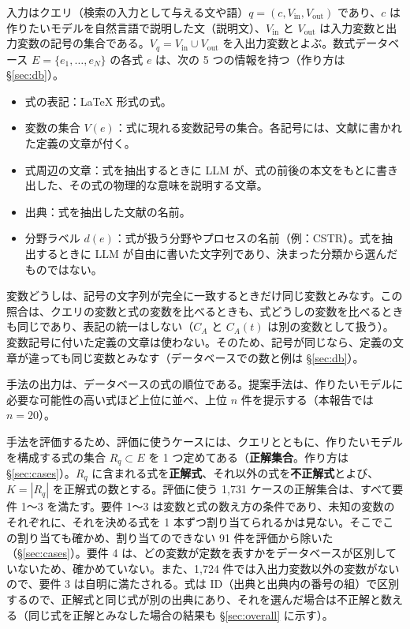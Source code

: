 \documentclass[11pt,a4paper]{ltjsarticle}
\newcommand{\Vin}{V_{\mathrm{in}}}
\newcommand{\Vout}{V_{\mathrm{out}}}
\begin{document}
入力はクエリ（検索の入力として与える文や語）$q = (c, \Vin, \Vout)$ であり、$c$ は作りたいモデルを自然言語で説明した文（説明文）、$\Vin$ と $\Vout$ は入力変数と出力変数の記号の集合である。$V_q = \Vin \cup \Vout$ を入出力変数とよぶ。数式データベース $E = \{e_1, \dots, e_N\}$ の各式 $e$ は、次の 5 つの情報を持つ（作り方は \S\ref{sec:db}）。
\begin{itemize}[leftmargin=1.5em]
  \item 式の表記：\LaTeX{} 形式の式。
  \item 変数の集合 $V(e)$：式に現れる変数記号の集合。各記号には、文献に書かれた定義の文章が付く。
  \item 式周辺の文章：式を抽出するときに LLM が、式の前後の本文をもとに書き出した、その式の物理的な意味を説明する文章。
  \item 出典：式を抽出した文献の名前。
  \item 分野ラベル $d(e)$：式が扱う分野やプロセスの名前（例：CSTR）。式を抽出するときに LLM が自由に書いた文字列であり、決まった分類から選んだものではない。
\end{itemize}
変数どうしは、記号の文字列が完全に一致するときだけ同じ変数とみなす。この照合は、クエリの変数と式の変数を比べるときも、式どうしの変数を比べるときも同じであり、表記の統一はしない（$C_A$ と $C_A(t)$ は別の変数として扱う）。変数記号に付いた定義の文章は使わない。そのため、記号が同じなら、定義の文章が違っても同じ変数とみなす（データベースでの数と例は \S\ref{sec:db}）。

手法の出力は、データベースの式の順位である。提案手法は、作りたいモデルに必要な可能性の高い式ほど上位に並べ、上位 $n$ 件を提示する（本報告では $n = 20$）。

手法を評価するため、評価に使うケースには、クエリとともに、作りたいモデルを構成する式の集合 $R_q \subset E$ を 1 つ定めてある（\textbf{正解集合}。作り方は \S\ref{sec:cases}）。$R_q$ に含まれる式を\textbf{正解式}、それ以外の式を\textbf{不正解式}とよび、$K = |R_q|$ を正解式の数とする。評価に使う 1{,}731 ケースの正解集合は、すべて要件 1〜3 を満たす。要件 1〜3 は変数と式の数え方の条件であり、未知の変数のそれぞれに、それを決める式を 1 本ずつ割り当てられるかは見ない。そこでこの割り当ても確かめ、割り当てのできない 91 件を評価から除いた（\S\ref{sec:cases}）。要件 4 は、どの変数が定数を表すかをデータベースが区別していないため、確かめていない。また、1{,}724 件では入出力変数以外の変数がないので、要件 3 は自明に満たされる。式は ID（出典と出典内の番号の組）で区別するので、正解式と同じ式が別の出典にあり、それを選んだ場合は不正解と数える（同じ式を正解とみなした場合の結果も \S\ref{sec:overall} に示す）。
\end{document}
